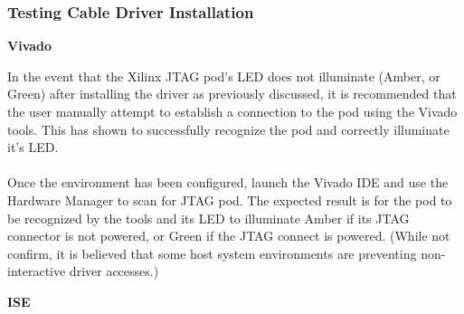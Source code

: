 \subsubsection{Testing Cable Driver Installation}
\textbf{Vivado}
\begin{flushleft}
In the event that the Xilinx JTAG pod's LED does not illuminate (Amber, or Green) after installing the driver as previously discussed, it is recommended that the user manually attempt to establish a connection to the pod using the Vivado tools. This has shown to successfully recognize the pod and correctly illuminate it's LED.\medskip\newline
{} \\
 \\\medskip
Once the environment has been configured, launch the Vivado IDE and use the Hardware Manager to scan for JTAG pod. The expected result is for the pod to be recognized by the tools and its LED to illuminate Amber if its JTAG connector is not powered, or Green if the JTAG connect is powered.\newline
(While not confirm, it is believed that some host system environments are preventing non-interactive driver accesses.)\medskip
\end{flushleft}
\textbf{ISE}
